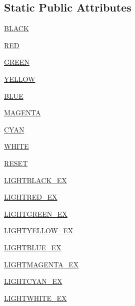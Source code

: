 \subsection*{Static Public Attributes}
\begin{DoxyCompactItemize}
\item 
\hyperlink{classpip_1_1__vendor_1_1colorama_1_1ansi_1_1AnsiFore_a4c668569209221183c22937f3ff05988}{B\+L\+A\+CK}
\item 
\hyperlink{classpip_1_1__vendor_1_1colorama_1_1ansi_1_1AnsiFore_a5987a19eab65ca624cab3ce8109ee0bc}{R\+ED}
\item 
\hyperlink{classpip_1_1__vendor_1_1colorama_1_1ansi_1_1AnsiFore_a4ace82b592c405447e4b7ee31e8ff011}{G\+R\+E\+EN}
\item 
\hyperlink{classpip_1_1__vendor_1_1colorama_1_1ansi_1_1AnsiFore_a4844a1c3eab6cfc3c0076d388eb6b07f}{Y\+E\+L\+L\+OW}
\item 
\hyperlink{classpip_1_1__vendor_1_1colorama_1_1ansi_1_1AnsiFore_acad4aea0903790f1a8bca8aa7185301c}{B\+L\+UE}
\item 
\hyperlink{classpip_1_1__vendor_1_1colorama_1_1ansi_1_1AnsiFore_a92a74dcf8becea141551cb4c3efaf689}{M\+A\+G\+E\+N\+TA}
\item 
\hyperlink{classpip_1_1__vendor_1_1colorama_1_1ansi_1_1AnsiFore_adb2574e001052ab4933d535a6d87e729}{C\+Y\+AN}
\item 
\hyperlink{classpip_1_1__vendor_1_1colorama_1_1ansi_1_1AnsiFore_af0704b3762677de8413de8c515965d22}{W\+H\+I\+TE}
\item 
\hyperlink{classpip_1_1__vendor_1_1colorama_1_1ansi_1_1AnsiFore_a207100966d3679060cea824428efa947}{R\+E\+S\+ET}
\item 
\hyperlink{classpip_1_1__vendor_1_1colorama_1_1ansi_1_1AnsiFore_acc0ce631cf88ccf3102b4704f9e79a09}{L\+I\+G\+H\+T\+B\+L\+A\+C\+K\+\_\+\+EX}
\item 
\hyperlink{classpip_1_1__vendor_1_1colorama_1_1ansi_1_1AnsiFore_a7f7c69f09175b85363aa4de1a8cd4d4f}{L\+I\+G\+H\+T\+R\+E\+D\+\_\+\+EX}
\item 
\hyperlink{classpip_1_1__vendor_1_1colorama_1_1ansi_1_1AnsiFore_a1d100d05a93d344c7a9c961ef30f77a8}{L\+I\+G\+H\+T\+G\+R\+E\+E\+N\+\_\+\+EX}
\item 
\hyperlink{classpip_1_1__vendor_1_1colorama_1_1ansi_1_1AnsiFore_a6bec47a5de145aa9de5fe2811ee4c05b}{L\+I\+G\+H\+T\+Y\+E\+L\+L\+O\+W\+\_\+\+EX}
\item 
\hyperlink{classpip_1_1__vendor_1_1colorama_1_1ansi_1_1AnsiFore_aac38876078b1d23481d972ed07243ecc}{L\+I\+G\+H\+T\+B\+L\+U\+E\+\_\+\+EX}
\item 
\hyperlink{classpip_1_1__vendor_1_1colorama_1_1ansi_1_1AnsiFore_ab343821b92c062396021c8b1855d2451}{L\+I\+G\+H\+T\+M\+A\+G\+E\+N\+T\+A\+\_\+\+EX}
\item 
\hyperlink{classpip_1_1__vendor_1_1colorama_1_1ansi_1_1AnsiFore_a01ee99f034f00056748e90b23fb9ceef}{L\+I\+G\+H\+T\+C\+Y\+A\+N\+\_\+\+EX}
\item 
\hyperlink{classpip_1_1__vendor_1_1colorama_1_1ansi_1_1AnsiFore_aa394681f156f620c7f94c9987d42dce9}{L\+I\+G\+H\+T\+W\+H\+I\+T\+E\+\_\+\+EX}
\end{DoxyCompactItemize}
